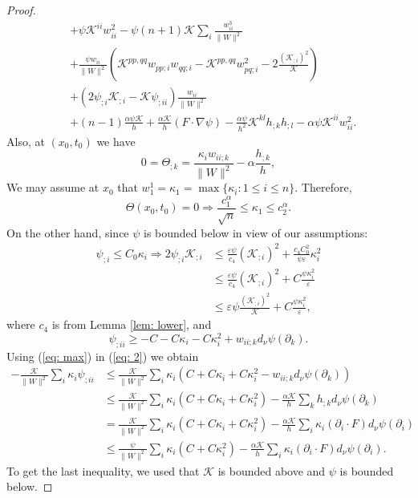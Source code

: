 \documentclass{amsart}
\theoremstyle{definition}
\theoremstyle{remark}
\numberwithin{equation}{section}
\begin{document}
\begin{proof}
\begin{align*}
&+ \psi\mathcal{K}^{ii} w_{ii}^2 - \psi(n+1) \mathcal{K} \sum_i\frac{w_{ii}^3}{\|W\|^2} \\
&+ \frac{\psi w_{ii}}{\|W\|^2} \left(\mathcal{K}^{pp,qq}w_{pp;i}w_{qq;i} - \mathcal{K}^{pp,qq}w_{pq;i}^2 - 2\frac{(\mathcal{K}_{;i})^2}{\mathcal{K}}\right) \\
&+ (2\psi_{;i}\mathcal{K}_{;i} - \mathcal{K}\psi_{;ii}) \frac{w_{ii}}{\|W\|^2} \\
&+ (n-1) \frac{\alpha\psi\mathcal{K}}{h} + \frac{\alpha\mathcal{K}}{h}(F\cdot\nabla\psi) - \frac{\alpha\psi}{h^2}\mathcal{K}^{kl} h_{;k} h_{;l} - \alpha\psi\mathcal{K}^{ii}w_{ii}^2.
\end{align*}
Also, at $(x_0,t_0)$ we have
\begin{equation}\label{eq: max}
0 = \Theta_{;k} = \frac{\kappa_iw_{ii;k}}{\|W\|^2} - \alpha\frac{h_{;k}}{h},
\end{equation}
We may assume at $x_0$ that $w_1^1=\kappa_1=\max\{\kappa_i:1\leq i\leq n\}.$ Therefore,
\begin{equation}\label{eq: max1}
\Theta(x_0,t_0)=0\Rightarrow\frac{c_1^{\alpha}}{\sqrt{n}}\leq \kappa_1\leq c_2^{\alpha}.
\end{equation}
On the other hand, since $\psi$ is bounded below in view of our assumptions:
\begin{align}\label{eq: 1}
\psi_{;i} \leq C_0\kappa_i \Rightarrow 2\psi_{;i} \mathcal{K}_{;i}&\leq \frac{\varepsilon\psi}{c_4} (\mathcal{K}_{;i})^2 + \frac{c_4C_0^2}{\psi\varepsilon}\kappa_i^2\nonumber\\
&\leq \frac{\varepsilon\psi}{c_4} (\mathcal{K}_{;i})^2 + C\frac{\psi\kappa_i^2}{\varepsilon}\nonumber\\
&\leq \varepsilon\psi \frac{(\mathcal{K}_{;i})^2}{\mathcal{K}} + C\frac{\psi\kappa_i^2}{\varepsilon},
\end{align}
where $c_4$ is from Lemma \ref{lem: lower},
and
\begin{equation}\label{eq: 2}
\psi_{;ii} \geq - C - C\kappa_i - C\kappa_i^2 + w_{ii;k} d_{\nu} \psi(\partial_k).
\end{equation}
Using (\ref{eq: max}) in (\ref{eq: 2}) we obtain
\begin{align}\label{eq: 3}
-\frac{\mathcal{K}}{\|W\|^2}\sum_i\kappa_i \psi_{;ii}&\leq \frac{\mathcal{K}}{\|W\|^2}\sum_i \kappa_i(C+C\kappa_i+C\kappa_i^2-w_{ii;k}d_{\nu}\psi(\partial_k))\nonumber\\
&\leq \frac{\mathcal{K}}{\|W\|^2}\sum_i \kappa_i(C+C\kappa_i+C\kappa_i^2)-\frac{\alpha\mathcal{K}}{h} \sum_k h_{;k} d_{\nu}\psi(\partial_k)\nonumber\\
&=\frac{\mathcal{K}}{\|W\|^2}\sum_i \kappa_i(C+C\kappa_i+C\kappa_i^2)-\frac{\alpha\mathcal{K}}{h}\sum_i \kappa_i(\partial_i\cdot F) d_{\nu}\psi(\partial_i)\nonumber\\
&\leq \frac{\psi}{\|W\|^2}\sum_i \kappa_i(C+C\kappa_i^2)-\frac{\alpha\mathcal{K}}{h}\sum_i \kappa_i(\partial_i\cdot F) d_{\nu}\psi(\partial_i).
\end{align}
To get the last inequality, we used that $\mathcal{K}$ is bounded above and $\psi$ is bounded below.



\end{proof}
\end{document}
